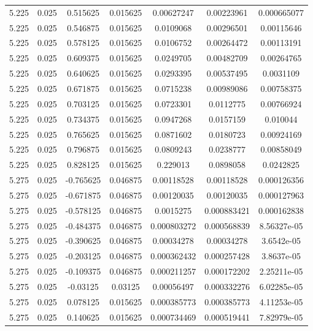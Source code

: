 \begin{table}[bh]
\begin{center}
{\begin{tabular}{ccccccc}
5.225	 & 0.025 & 	0.515625	 & 0.015625	 & 0.00627247	 & 0.00223961	 & 0.000665077 \\ 
5.225	 & 0.025 & 	0.546875	 & 0.015625	 & 0.0109068	 & 0.00296501	 & 0.00115646 \\ 
5.225	 & 0.025 & 	0.578125	 & 0.015625	 & 0.0106752	 & 0.00264472	 & 0.00113191 \\ 
5.225	 & 0.025 & 	0.609375	 & 0.015625	 & 0.0249705	 & 0.00482709	 & 0.00264765 \\ 
5.225	 & 0.025 & 	0.640625	 & 0.015625	 & 0.0293395	 & 0.00537495	 & 0.0031109 \\ 
5.225	 & 0.025 & 	0.671875	 & 0.015625	 & 0.0715238	 & 0.00989086	 & 0.00758375 \\ 
5.225	 & 0.025 & 	0.703125	 & 0.015625	 & 0.0723301	 & 0.0112775	 & 0.00766924 \\ 
5.225	 & 0.025 & 	0.734375	 & 0.015625	 & 0.0947268	 & 0.0157159	 & 0.010044 \\ 
5.225	 & 0.025 & 	0.765625	 & 0.015625	 & 0.0871602	 & 0.0180723	 & 0.00924169 \\ 
5.225	 & 0.025 & 	0.796875	 & 0.015625	 & 0.0809243	 & 0.0238777	 & 0.00858049 \\ 
5.225	 & 0.025 & 	0.828125	 & 0.015625	 & 0.229013	 & 0.0898058	 & 0.0242825 \\ 
5.275	 & 0.025 & 	-0.765625	 & 0.046875	 & 0.00118528	 & 0.00118528	 & 0.000126356 \\ 
5.275	 & 0.025 & 	-0.671875	 & 0.046875	 & 0.00120035	 & 0.00120035	 & 0.000127963 \\ 
5.275	 & 0.025 & 	-0.578125	 & 0.046875	 & 0.0015275	 & 0.000883421	 & 0.000162838 \\ 
5.275	 & 0.025 & 	-0.484375	 & 0.046875	 & 0.000803272	 & 0.000568839	 & 8.56327e-05 \\ 
5.275	 & 0.025 & 	-0.390625	 & 0.046875	 & 0.00034278	 & 0.00034278	 & 3.6542e-05 \\ 
5.275	 & 0.025 & 	-0.203125	 & 0.046875	 & 0.000362432	 & 0.000257428	 & 3.8637e-05 \\ 
5.275	 & 0.025 & 	-0.109375	 & 0.046875	 & 0.000211257	 & 0.000172202	 & 2.25211e-05 \\ 
5.275	 & 0.025 & 	-0.03125	 & 0.03125	 & 0.00056497	 & 0.000332276	 & 6.02285e-05 \\ 
5.275	 & 0.025 & 	0.078125	 & 0.015625	 & 0.000385773	 & 0.000385773	 & 4.11253e-05 \\ 
5.275	 & 0.025 & 	0.140625	 & 0.015625	 & 0.000734469	 & 0.000519441	 & 7.82979e-05 \\ 

\end{tabular}}
\end{center}
\end{table}
